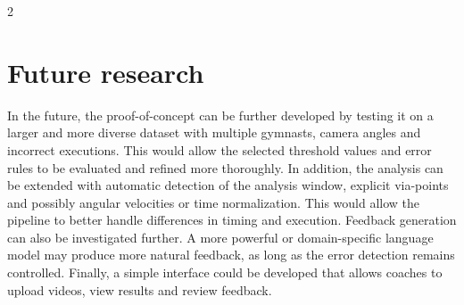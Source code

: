 \documentclass[a0,portrait, english]{hogent-poster}
\begin{document}
\begin{multicols}{2}
       \section{Future research} 
       
       In the future, the proof-of-concept can be further developed by testing it on a larger and more diverse dataset with multiple gymnasts, camera angles and incorrect executions. This would allow the selected threshold values and error rules to be evaluated and refined more thoroughly. In addition, the analysis can be extended with automatic detection of the analysis window, explicit via-points and possibly angular velocities or time normalization. This would allow the pipeline to better handle differences in timing and execution. Feedback generation can also be investigated further. A more powerful or domain-specific language model may produce more natural feedback, as long as the error detection remains controlled. Finally, a simple interface could be developed that allows coaches to upload videos, view results and review feedback.
        
    \end{multicols}
\end{document}
